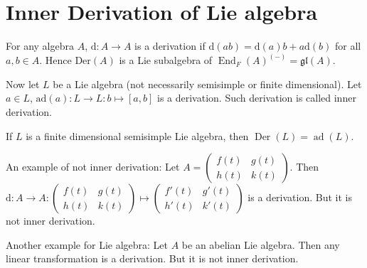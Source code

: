 \section{Inner Derivation of Lie algebra}

For any algebra $A$, $\mathrm{d}: A \to A$ is a derivation if $\mathrm{d}(ab)=\mathrm{d}(a)b+a\mathrm{d}(b)$ for all $a,b \in A$. Hence $\mathrm{Der}(A)$ is a Lie subalgebra of $\operatorname{End}_F(A)^{(-)}=\mathfrak{gl}(A)$.

Now let $L$ be a Lie algebra (not necessarily semisimple or finite dimensional). Let $a \in L$, $\mathrm{ad}(a): L \to L : b \mapsto [a,b]$ is a derivation. Such derivation is called inner derivation.

\begin{theorem}
    If $L$ is a finite dimensional semisimple Lie algebra, then $\operatorname{Der}(L) = \operatorname{ad}(L)$.
\end{theorem}

\begin{remark}
    An example of not inner derivation: Let $A=\begin{pmatrix} f(t) & g(t) \\ h(t) & k(t) \end{pmatrix}$. Then $\mathrm{d}: A \to A : \begin{pmatrix} f(t) & g(t) \\ h(t) & k(t) \end{pmatrix} \mapsto \begin{pmatrix} f'(t) & g'(t) \\ h'(t) & k'(t) \end{pmatrix}$ is a derivation. But it is not inner derivation.

    Another example for Lie algebra: Let $A$ be an abelian Lie algebra. Then any linear transformation is a derivation. But it is not inner derivation.
\end{remark}

